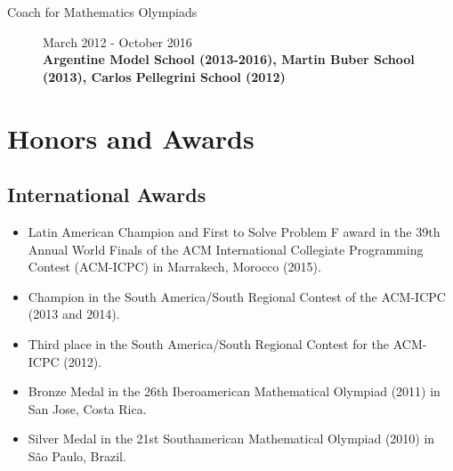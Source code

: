 \documentclass [a4paper, 11pt]{article}
\newcommand{\tabu}{\hspace*{0.7cm}}
\begin{document}
\begin{description}
\item[Coach for Mathematics Olympiads] {\hfill March 2012 - October 2016 \\ 
\textbf{\small Argentine Model School (2013-2016), Martin Buber School (2013), Carlos Pellegrini School (2012)} \\
	}

\end{description}

\section* {Honors and Awards}

\subsection* {International Awards}
{\small
\begin{itemize} \itemsep.05cm
	\item[] Latin American Champion and First to Solve Problem F award in the 39th Annual World Finals of the ACM International Collegiate Programming Contest (ACM-ICPC) in Marrakech, Morocco (2015).
	\item[] Champion in the South America/South Regional Contest of the ACM-ICPC (2013 and 2014).
	\item[] Third place in the South America/South Regional Contest for the ACM-ICPC (2012).
	\item[] Bronze Medal in the 26th Iberoamerican Mathematical Olympiad (2011) in San Jose, Costa Rica.
	\item[] Silver Medal in the 21st Southamerican Mathematical Olympiad (2010) in S\~ao Paulo, Brazil. 
\end{itemize}
}
\end{document}
